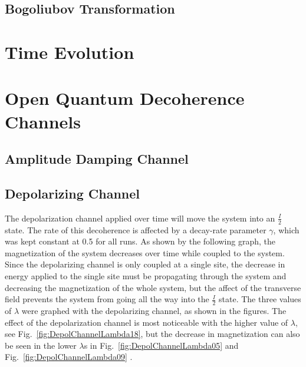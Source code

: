 \documentclass[12pt]{article}
\begin{document}
  \subsection{Bogoliubov Transformation}

  \section{Time Evolution}

  \section{Open Quantum Decoherence Channels}

  \subsection{Amplitude Damping Channel}

  \subsection{Depolarizing Channel}
The depolarization channel applied over time will move the system into an $\frac{I}{2}$ state. The rate of this decoherence is affected by a decay-rate parameter $\gamma$, which was kept constant at 0.5 for all runs. As shown by the following graph, the magnetization of the system decreases over time while coupled to the system. Since the depolarizing channel is only coupled at a single site, the decrease in energy applied to the single site must be propagating through the system and decreasing the magnetization of the whole system, but the affect of the transverse field prevents the system from going all the way into the $\frac{I}{2}$ state. The three values of $\lambda$ were graphed with the depolarizing channel, as shown in the figures. The effect of the depolarization channel is most noticeable with the higher value of $\lambda$, see Fig.~\ref{fig:DepolChannelLambda18},  but the decrease in magnetization can also be seen in the lower $\lambda$s in Fig.~\ref{fig:DepolChannelLambda05} and Fig.~\ref{fig:DepolChannelLambda09} .
\end{document}
